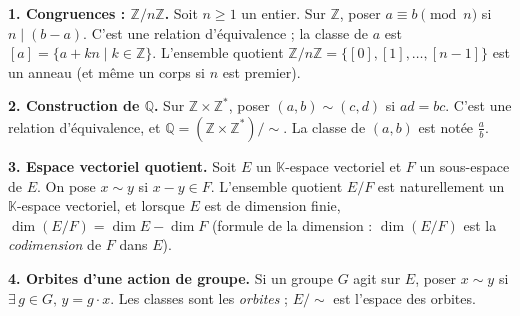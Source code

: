 \begin{mdframed}[style=exbar]
  \textbf{1. Congruences : $\mathbb{Z}/n\mathbb{Z}$.}\enspace%
  Soit $n \geq 1$ un entier. Sur $\mathbb{Z}$, poser $a \equiv b \pmod{n}$ si $n \mid (b-a)$.
  C'est une relation d'équivalence ; la classe de $a$ est
  $[a] = \{a + kn \mid k \in \mathbb{Z}\}$.
  L'ensemble quotient $\mathbb{Z}/n\mathbb{Z} = \{[0],[1],\ldots,[n-1]\}$
  est un anneau (et même un corps si $n$ est premier).

  \smallskip\noindent
  \textbf{2. Construction de $\mathbb{Q}$.}\enspace%
  Sur $\mathbb{Z}\times\mathbb{Z}^*$, poser $(a,b)\sim(c,d)$ si $ad = bc$.
  C'est une relation d'équivalence, et
  $\mathbb{Q} = (\mathbb{Z}\times\mathbb{Z}^*)/{\sim}$.
  La classe de $(a,b)$ est notée $\tfrac{a}{b}$.

  \smallskip\noindent
  \textbf{3. Espace vectoriel quotient.}\enspace%
  Soit $E$ un $\mathbb{K}$-espace vectoriel et $F$ un sous-espace de $E$.
  On pose $x \sim y$ si $x-y \in F$.
  L'ensemble quotient $E/F$ est naturellement un $\mathbb{K}$-espace vectoriel,
  et lorsque $E$ est de dimension finie, $\dim(E/F) = \dim E - \dim F$
  (formule de la dimension : $\dim(E/F)$ est la
  \emph{codimension} de $F$ dans $E$).

  \smallskip\noindent
  \textbf{4. Orbites d'une action de groupe.}\enspace%
  Si un groupe $G$ agit sur $E$, poser $x \sim y$ si $\exists\,g \in G,\, y=g\cdot x$.
  Les classes sont les \emph{orbites} ; $E/{\sim}$ est l'espace des orbites.
\end{mdframed}

\decsep{}



